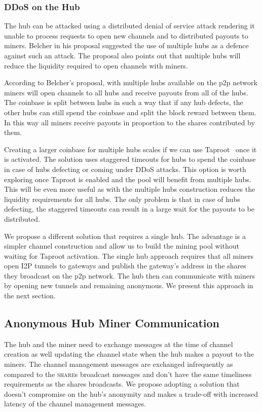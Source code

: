 \documentclass{article}
\begin{document}
\subsubsection{DDoS on the Hub}\label{ref:ddos-attack}

The hub can be attacked using a distributed denial of service attack
rendering it unable to process requests to open new channels and to
distributed payouts to miners. Belcher in his proposal suggested the
use of multiple hubs as a defence against such an attack. The proposal
also points out that multiple hubs will reduce the liquidity required
to open channels with miners.

According to Belcher's proposal, with multiple hubs available on the
p2p network miners will open channels to all hubs and receive payouts
from all of the hubs. The coinbase is split between hubs in such a way
that if any hub defects, the other hubs can still spend the coinbase
and split the block reward between them. In this way all miners
receive payouts in proportion to the shares contributed by them.

Creating a larger coinbase for multiple hubs scales if we can use
Taproot~\cite{bip340,bip341, bip342} once it is activated. The
solution uses staggered timeouts for hubs to spend the coinbase in
case of hubs defecting or coming under DDoS attacks. This option is
worth exploring once Taproot is enabled and the pool will benefit from
multiple hubs. This will be even more useful as with the multiple hubs
construction reduces the liquidity requirements for all hubs. The only
problem is that in case of hubs defecting, the staggered timeouts can
result in a large wait for the payouts to be distributed.

We propose a different solution that requires a single hub. The
advantage is a simpler channel construction and allow us to build the
mining pool without waiting for Taproot activation. The single hub
approach requires that all miners open I2P tunnels to gateways and
publish the gateway's address in the shares they broadcast on the p2p
network. The hub then can communicate with miners by opening new
tunnels and remaining anonymous. We present this approach in the next
section.

\subsection{Anonymous Hub Miner
  Communication}\label{sec:hub-miner-communication}

The hub and the miner need to exchange messages at the time of channel
creation as well updating the channel state when the hub makes a
payout to the miners. The channel management messages are exchanged
infrequently as compared to the \textsc{share}s broadcast messages and
don't have the same timeliness requirements as the shares
broadcasts. We propose adopting a solution that doesn't compromise on
the hub's anonymity and makes a trade-off with increased latency of
the channel management messages.
\end{document}
